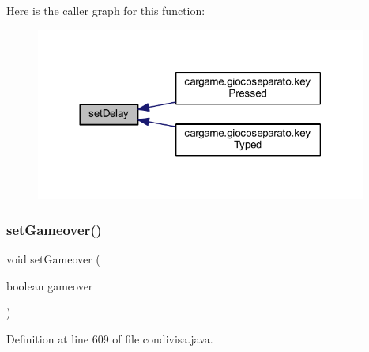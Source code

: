 Here is the caller graph for this function\+:
\nopagebreak
\begin{figure}[H]
\begin{center}
\leavevmode
\includegraphics[width=308pt]{classcargame_1_1condivisa_a511f425b438de1dfc7952baa3422e055_icgraph}
\end{center}
\end{figure}
\mbox{\label{classcargame_1_1condivisa_a69ebe98d89726ab5ee3c8bb7774d7541}} 
\subsubsection{\texorpdfstring{set\+Gameover()}{setGameover()}}
{\footnotesize\ttfamily void set\+Gameover (\begin{DoxyParamCaption}\item[{boolean}]{gameover }\end{DoxyParamCaption})}



Definition at line 609 of file condivisa.\+java.


